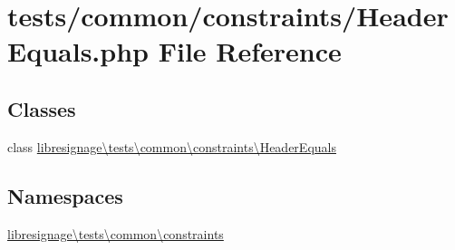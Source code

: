 \hypertarget{HeaderEquals_8php}{}\section{tests/common/constraints/\+Header\+Equals.php File Reference}
\label{HeaderEquals_8php}
\subsection*{Classes}
\begin{DoxyCompactItemize}
\item 
class \hyperlink{classlibresignage_1_1tests_1_1common_1_1constraints_1_1HeaderEquals}{libresignage\textbackslash{}tests\textbackslash{}common\textbackslash{}constraints\textbackslash{}\+Header\+Equals}
\end{DoxyCompactItemize}
\subsection*{Namespaces}
\begin{DoxyCompactItemize}
\item 
 \hyperlink{namespacelibresignage_1_1tests_1_1common_1_1constraints}{libresignage\textbackslash{}tests\textbackslash{}common\textbackslash{}constraints}
\end{DoxyCompactItemize}
